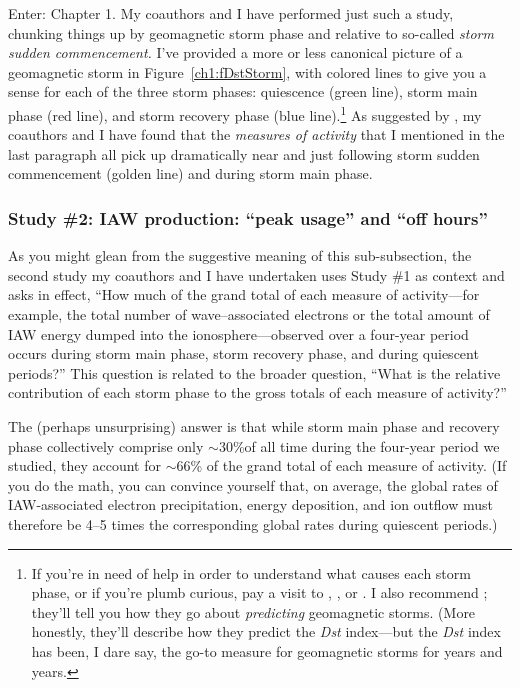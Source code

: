 Enter: Chapter 1. My coauthors and I have performed just such a study, chunking
things up by geomagnetic storm phase and relative to so-called \emph{storm
  sudden commencement.} I've provided a more or less canonical picture of a
geomagnetic storm in Figure~\ref{ch1:fDstStorm}, with colored lines to give you
a sense for each of the three storm phases: quiescence (green line), storm main
phase (red line), and storm recovery phase (blue line).\footnote{If you're in
  need of help in order to understand what causes each storm phase, or if you're
  plumb curious, pay a visit to \citet{Gonzalez1994}, \citet{Denton2006}, or
  \citet{Lakhina2008}. I also recommend \citet{Lundstedt2002}; they'll tell you
  how they go about \emph{predicting} geomagnetic storms. (More honestly,
  they'll describe how they predict the \textit{Dst} index---but the
  \textit{Dst} index has been, I dare say, the go-to measure for geomagnetic
  storms for years and years.} As suggested by \citet{Chaston2007}, my coauthors
and I have found that the \emph{measures of \Alfic activity} that I mentioned in
the last paragraph all pick up dramatically near and just following storm sudden
commencement (golden line) and during storm main phase.

\subsubsection{Study \#2: IAW production: ``peak usage'' and ``off hours''}

As you might glean from the suggestive meaning of this sub-subsection, the
second study my coauthors and I have undertaken uses Study \#1 as context and
asks in effect, ``How much of the grand total of each measure of \Alfic
activity---for example, the total number of \Alf wave--associated electrons or
the total amount of IAW energy dumped into the ionosphere---observed over a
four-year period occurs during storm main phase, storm recovery phase, and
during quiescent periods?'' This question is related to the broader question,
``What is the relative contribution of each storm phase to the gross totals of
each measure of \Alfic activity?''

The (perhaps unsurprising) answer is that while storm main phase and recovery
phase collectively comprise only $\sim$30\%of all time during the four-year
period we studied, they account for $\sim$66\% of the grand total of each
measure of \Alfic activity. (If you do the math, you can convince yourself that,
on average, the global rates of IAW-associated electron precipitation, energy
deposition, and ion outflow must therefore be 4--5 times the corresponding
global rates during quiescent periods.)

